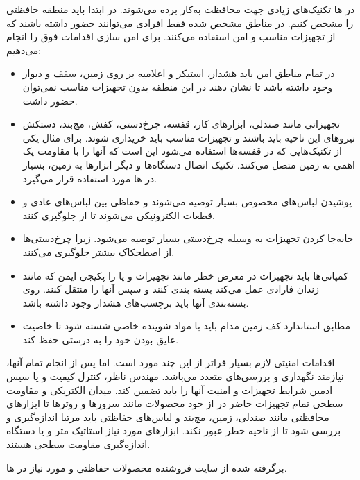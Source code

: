 \documentclass[a4paper]{article}
\begin{document}
در ها تکنیک‌های زیادی جهت محافظت  به‌کار برده می‌شوند. در ابتدا باید منطقه حافظتی را مشخص کنیم.
در مناطق مشخص شده فقط افرادی می‌توانند حضور داشته باشند که از تجهیزات مناسب و امن استفاده می‌کنند. برای امن سازی 
اقدامات فوق را انجام می‌دهیم:
\begin{itemize}
\item
در تمام مناطق امن  باید هشدار، استیکر و اعلامیه بر روی زمین، سقف و دیوار وجود داشته باشد تا نشان دهند در این منطقه
بدون تجهیزات مناسب نمی‌توان حضور داشت.
\item
تجهیزاتی مانند صندلی، ابزارهای کار، قفسه، چرخ‌دستی، کفش، مچ‌بند، دستکش نیروهای این ناحیه باید 
باشند و تجهیزات مناسب باید خریداری شوند. برای مثال یکی از تکنیک‌هایی که در قفسه‌ها استفاده می‌شود
این است که آنها را با مقاومت یک اهمی به زمین متصل می‌کنند.
تکنیک اتصال دستگاه‌ها و دیگر ابزارها به زمین، بسیار در ها مورد استفاده قرار می‌گیرد.
\item
پوشیدن لباس‌های مخصوص  بسیار توصیه می‌شوند و حفاظی بین لباس‌های عادی و قطعات الکترونیکی می‌شوند تا از 
جلوگیری کنند.
\item
جابه‌جا کردن تجهیزات به وسیله چرخ‌دستی بسیار توصیه می‌شود. زیرا چرخ‌دستی‌ها از اصطحکاک بیشتر جلوگیری می‌کنند.
\item
کمپانی‌ها باید تجهیزات در معرض خطر مانند تجهیزات  و یا  را پکیجی ایمن که مانند زندان فارادی
عمل می‌کند بسته بندی کنند و سپس آنها را منتقل کنند. روی بسته‌بندی آنها باید برچسب‌های هشدار  وجود داشته باشد.
\item
مطابق استاندارد  کف زمین مدام باید با مواد شوینده خاصی شسته شود تا خاصیت عایق بودن خود را به درستی حفظ کند.
\end{itemize}
اقدامات امنیتی لازم بسیار فراتر از این چند مورد است. اما پس از انجام تمام آنها،  نیازمند نگهداری و بررسی‌های متعدد می‌باشد.
مهندس ناظر، کنترل کیفیت و یا سیس ادمین شرایط تجهیزات و امنیت آنها را باید تضمین کند. میدان الکتریکی و مقاومت سطحی
تمام تجهیزات حاضر در  از خود محصولات مانند سرورها و روترها تا ابزارهای محافظتی مانند صندلی، زمین، مچ‌بند و لباس‌های حفاظتی
باید مرتبا اندازه‌گیری و بررسی شود تا از ناحیه خطر عبور نکند. ابزارهای مورد نیاز استاتیک متر
و یا دستگاه اندازه‌گیری مقاومت سطحی
هستند.

برگرفته شده از سایت 
فروشنده محصولات حفاظتی و مورد نیاز در ها.
\end{document}
